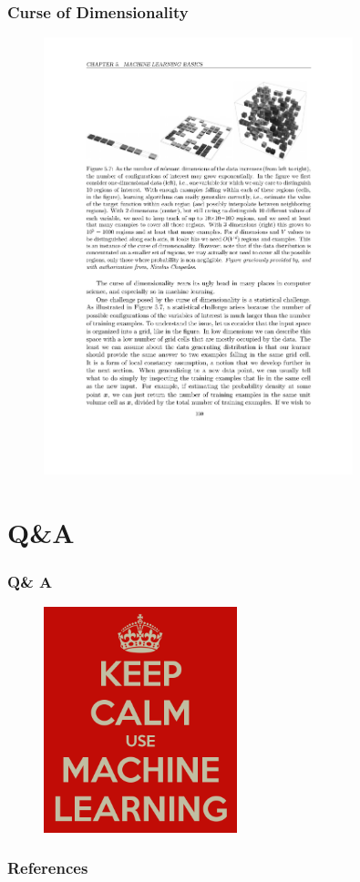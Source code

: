 \documentclass{beamer}
\begin{document}
\begin{frame}
  \frametitle{Curse of Dimensionality}

  \begin{figure}
    \centering
    \includegraphics[width=0.8\textwidth]{curse_of_dimensionality.pdf}
  \end{figure}
\end{frame}

\section*{Q\&A}
\begin{frame}
  \frametitle{Q\& A}
  \begin{figure}
    \centering
    \includegraphics[width=0.5\textwidth]{machine_learning_logo.png}
  \end{figure}
\end{frame}

\begin{frame}[allowframebreaks]
\frametitle{References}
\footnotesize


\end{frame}
\end{document}
